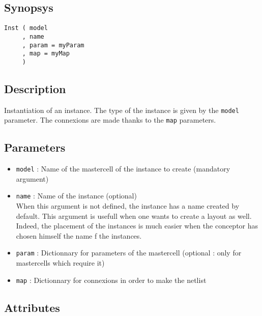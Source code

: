 \subsection{Synopsys}

\begin{verbatim}
Inst ( model
     , name
     , param = myParam
     , map = myMap
     )
\end{verbatim}

\subsection{Description}

Instantiation of an instance. The type of the instance is given by the \verb-model- parameter. The connexions are made thanks to the \verb-map- parameters.

\subsection{Parameters}

\begin{itemize}
    \item \verb-model- : Name of the mastercell of the instance to create (mandatory argument)
    \item \verb-name- : Name of the instance (optional)\\
When this argument is not defined, the instance has a name created by default. This argument is usefull when one wants to create a layout as well. Indeed, the placement of the instances is much easier when the conceptor has chosen himself the name f the instances.
    \item \verb-param- : Dictionnary for parameters of the mastercell (optional : only for mastercells which require it)
    \item \verb-map- : Dictionnary for connexions in order to make the netlist\\
\end{itemize}

\subsection{Attributes}

